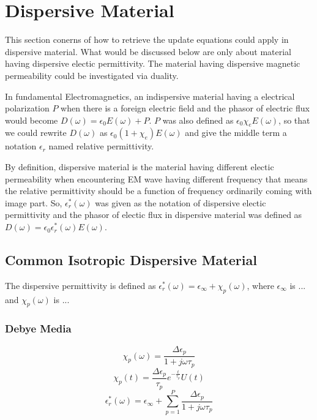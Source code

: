 \section{Dispersive Material}
This section conerns of how to retrieve the update equations could apply in dispersive material. What would be discussed
below are only about material having dispersive electic permittivity. The material having dispersive magnetic
permeability could be investigated via duality.

In fundamental Electromagnetics, an indispersive material having a electrical polarization $P$ when there is a foreign
electric field and the phasor of electric flux would become $D(\omega) = \epsilon_0 E(\omega) + P$. $P$ was also defined
as $\epsilon_0 \chi_e E(\omega)$, so that we could rewrite $D(\omega)$ as $\epsilon_0 (1+\chi_e)E(\omega)$ and give the middle term a notation
$\epsilon_r$ named relative permittivity.

By definition, dispersive material is the material having different electic permeability when encountering EM wave
having different frequency that means the relative permittivity should be a function of frequency ordinarily coming with
image part. So, $\epsilon_r^*(\omega)$ was given as the notation of dispersive electic permittivity and the phasor of
electic flux in dispersive material was defined as $D(\omega) = \epsilon_0 \epsilon_r^*(\omega)E(\omega)$.
\subsection{Common Isotropic Dispersive Material}
The dispersive permittivity is defined as $\epsilon_r^*(\omega) = \epsilon_{\infty} + \chi_p(\omega)$, where
$\epsilon_{\infty}$ is ... and $\chi_p(\omega)$ is ...

\subsubsection{Debye Media}
\begin{equation}
  \chi_p(\omega) = \frac{\Delta\epsilon_p}{1+j\omega\tau_p}  
\end{equation}
\begin{equation}
  \chi_p(t) = \frac{\Delta \epsilon_p}{\tau_p} e^{-\frac{t}{\tau_p}}U(t)  
\end{equation}
\begin{equation}
  \epsilon_r^*(\omega) = \epsilon_{\infty} + \sum_{p=1}^P \frac{\Delta\epsilon_p}{1+j\omega\tau_p}  
\end{equation}



